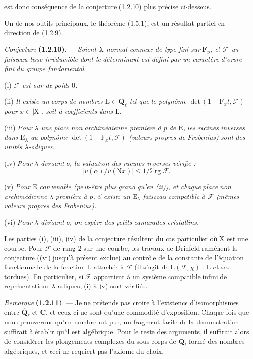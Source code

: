 \documentclass[11pt,leqno]{article}
\newcommand{\Page}[1]{\ifvmode\noindent\else\unskip\ \fi{\footnotesize\textcolor{gray}{[p.\,#1]}}\ \ignorespaces}
\begin{document}
\noindent est donc conséquence de la conjecture (1.2.10) plus précise ci-dessous.

Un de nos outils principaux, le théorème (1.5.1), est un résultat partiel en direction de (1.2.9).

\textit{Conjecture} \textbf{(1.2.10)}. — \textit{Soient \(\mathrm{X}\) normal connexe de type fini sur \(\mathbf{F}_p\), et \(\mathscr{F}\) un faisceau lisse irréductible dont le déterminant est défini par un caractère d’ordre fini du groupe fondamental.}

(i) \textit{\(\mathscr{F}\) est pur de poids \(0\).}

(ii) \textit{Il existe un corps de nombres \(\mathrm{E}\subset\overline{\mathbf{Q}}_\ell\) tel que le polynôme \(\det(1-\mathrm{F}_xt,\mathscr{F})\) pour \(x\in|\mathrm{X}|\), soit à coefficients dans \(\mathrm{E}\).}

(iii) \textit{Pour \(\lambda\) une place non archimédienne première à \(p\) de \(\mathrm{E}\), les racines inverses dans \(\overline{\mathrm{E}}_\lambda\) du polynôme \(\det(1-\mathrm{F}_xt,\mathscr{F})\) (valeurs propres de Frobenius) sont des unités \(\lambda\)-adiques.}

(iv) \textit{Pour \(\lambda\) divisant \(p\), la valuation des racines inverses vérifie :}
\[
|v(\alpha)/v(\mathrm{N}x)|\leq1/2\operatorname{rg}\mathscr{F}.
\]

(v) \textit{Pour \(\mathrm{E}\) convenable (peut-être plus grand qu’en \textup{(ii)}), et chaque place non archimédienne \(\lambda\) première à \(p\), il existe un \(\mathrm{E}_\lambda\)-faisceau compatible à \(\mathscr{F}\) (mêmes valeurs propres des Frobenius).}

(vi) \textit{Pour \(\lambda\) divisant \(p\), on espère des petits camarades cristallins.}

Les parties (i), (iii), (iv) de la conjecture résultent du cas particulier où \(\mathrm{X}\) est une courbe. Pour \(\mathscr{F}\) de rang \(2\) sur une courbe, les travaux de Drinfeld ramènent la
\Page{156}
conjecture ((vi) jusqu’à présent exclue) au contrôle de la constante de l’équation fonctionnelle de la fonction \(\mathrm{L}\) attachée à \(\mathscr{F}\) (il s’agit de \(\mathrm{L}(\mathscr{F},\chi)\) : \(\mathrm{L}\) et ses tordues). En particulier, si \(\mathscr{F}\) appartient à un système compatible infini de représentations \(\lambda\)-adiques, (i) à (v) sont vérifiés.

\textit{Remarque} \textbf{(1.2.11)}. — Je ne prétends pas croire à l’existence d’isomorphismes entre \(\overline{\mathbf{Q}}_\ell\) et \(\mathbf{C}\), et ceux-ci ne sont qu’une commodité d’exposition. Chaque fois que nous prouverons qu’un nombre est pur, un fragment facile de la démonstration suffirait à établir qu’il est algébrique. Pour le reste des arguments, il suffirait alors de considérer les plongements complexes du sous-corps de \(\overline{\mathbf{Q}}_\ell\) formé des nombres algébriques, et ceci ne requiert pas l’axiome du choix.
\end{document}
